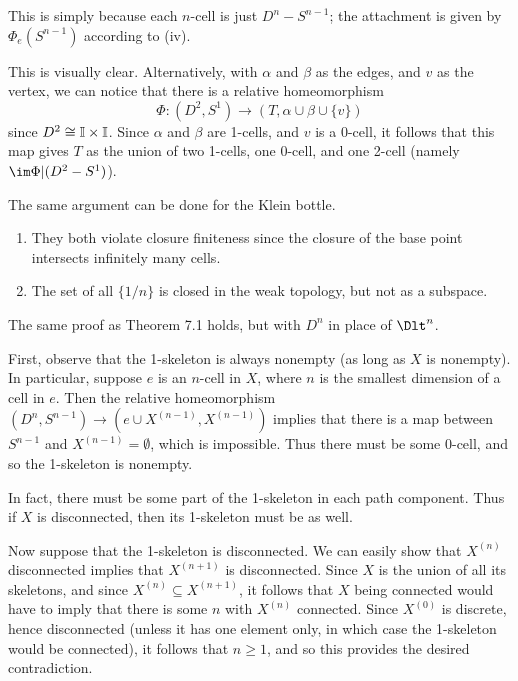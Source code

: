\documentclass[../../solutions.tex]{subfiles}
\begin{document}
\begin{exercise} \leavevmode
This is simply because each $n$-cell is just $D^n-S^{n-1}$;
the attachment is given by $\Phi_e(S^{n-1})$ according to (iv).
\end{exercise}

\begin{exercise} \leavevmode
This is visually clear.
Alternatively, with $\alpha$ and $\beta$ as the edges, and $v$ as the vertex, we can notice that there is a relative homeomorphism
\[\Phi:(D^2,S^1)\to(T,\alpha\cup\beta\cup\{v\})\]
since $D^2\cong\mathbb I\times\mathbb I$.
Since $\alpha$ and $\beta$ are 1-cells, and $v$ is a 0-cell, it follows that this map gives $T$ as the union of two 1-cells, one 0-cell, and one 2-cell (namely $\im\Phi|(D^2-S^1)$).

The same argument can be done for the Klein bottle.
\end{exercise}

\begin{exercise} \leavevmode
\begin{enumerate}
\item 
They both violate closure finiteness since the closure of the base point intersects infinitely many cells.
\item
The set of all $\{1/n\}$ is closed in the weak topology, but not as a subspace.
\end{enumerate}
\end{exercise}

\begin{exercise} \leavevmode
The same proof as Theorem 7.1 holds, but with $D^n$ in place of $\Dlt^n$.
\end{exercise}

\begin{exercise} \leavevmode
First, observe that the 1-skeleton is always nonempty (as long as $X$ is nonempty).
In particular, suppose $e$ is an $n$-cell in $X$, where $n$ is the smallest dimension of a cell in $e$.
Then the relative homeomorphism $(D^n,S^{n-1})\to(e\cup X^{(n-1)},X^{(n-1)})$ implies that there is a map between $S^{n-1}$ and $X^{(n-1)}=\emptyset$, which is impossible.
Thus there must be some 0-cell, and so the 1-skeleton is nonempty.

In fact, there must be some part of the 1-skeleton in each path component.
Thus if $X$ is disconnected, then its 1-skeleton must be as well.

Now suppose that the 1-skeleton is disconnected.
We can easily show that $X^{(n)}$ disconnected implies that $X^{(n+1)}$ is disconnected.
Since $X$ is the union of all its skeletons, and since $X^{(n)}\subseteq X^{(n+1)}$, it follows that $X$ being connected would have to imply that there is some $n$ with $X^{(n)}$ connected.
Since $X^{(0)}$ is discrete, hence disconnected (unless it has one element only, in which case the 1-skeleton would be connected), it follows that $n\ge1$, and so this provides the desired contradiction.
\end{exercise}
\end{document}
